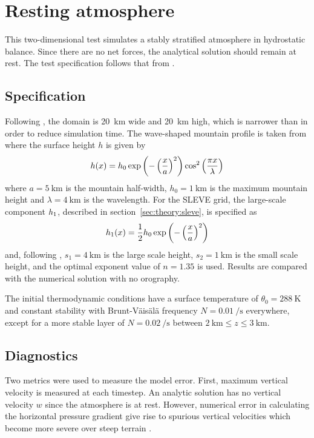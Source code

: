 \section{Resting atmosphere}
\label{sec:resting}

This two-dimensional test simulates a stably stratified atmosphere in hydrostatic balance.  Since there are no net forces, the analytical solution should remain at rest.  The test specification follows that from \textcite{klemp2011}.  

\subsection{Specification}
Following \textcite{weller-shahrokhi2014}, the domain is \SI{20}{\kilo\meter} wide and \SI{20}{\kilo\meter} high, which is narrower than \textcite{klemp2011} in order to reduce simulation time.  The wave-shaped mountain profile is taken from \textcite{schaer2002} where the surface height $h$ is given by
\begin{align}
h(x) = h_0 \exp \left( - \left( \frac{x}{a} \right)^2 \right) \cos^2 \left( \frac{\pi x}{\lambda} \right)
\end{align}
where $a = \SI{5}{\kilo\meter}$ is the mountain half-width, $h_0 = \SI{1}{\kilo\meter}$ is the maximum mountain height and $\lambda = \SI{4}{\kilo\meter}$ is the wavelength.  For the SLEVE grid, the large-scale component $h_1$, described in section~\ref{sec:theory:sleve}, is specified as
\begin{align}
h_1(x) = \frac{1}{2} h_0 \exp \left( - \left( \frac{x}{a} \right)^2 \right)
\end{align}
and, following \cite{leuenberger2010}, $s_1 = \SI{4}{\kilo\meter}$ is the large scale height, $s_2 = \SI{1}{\kilo\meter}$ is the small scale height, and the optimal exponent value of $n = 1.35$ is used.  Results are compared with the numerical solution with no orography.

The initial thermodynamic conditions have a surface temperature of $\theta_0 = \SI{288}{\kelvin}$ and constant stability with Brunt-V\"ais\"al\"a frequency $N = \SI{0.01}{\per\second}$ everywhere, except for a more stable layer of $N = \SI{0.02}{\per\second}$ between $\SI{2}{\kilo\meter} \leq z \leq \SI{3}{\kilo\meter}$.

\subsection{Diagnostics}
Two metrics were used to measure the model error.  First, maximum vertical velocity is measured at each timestep.  An analytic solution has no vertical velocity $w$ since the atmosphere is at rest.  However, numerical error in calculating the horizontal pressure gradient give rise to spurious vertical velocities which become more severe over steep terrain \autocite{klemp2011}.

